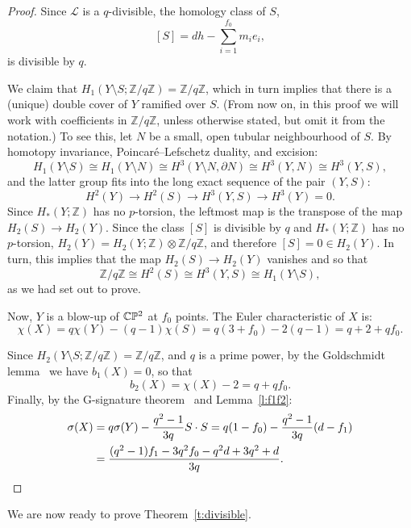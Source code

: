 \documentclass[a4paper,12pt, onesided]{amsart}
\theoremstyle{remark}
\numberwithin{figure}{section}
\numberwithin{equation}{section}
\newcommand{\Z}{\mathbb{Z}}
\newcommand{\CP}{\mathbb{CP}\vphantom{\mathbb{P}}^2}
\renewcommand{\L}{\mathcal{L}}
\newcommand{\del}{\partial}
\begin{document}
\begin{proof}
Since $\L$ is a $q$-divisible, the homology class of $S$,
\[
[S] = dh - \sum_{i=1}^{f_0} m_i e_i,
\]
is divisible by $q$.

We claim that $H_1(Y\setminus S;\Z/q\Z) = \Z/q\Z$, which in turn implies that there is a (unique) double cover of $Y$ ramified over $S$.
(From now on, in this proof we will work with coefficients in $\Z/q\Z$, unless otherwise stated, but omit it from the notation.)
To see this, let $N$ be a small, open tubular neighbourhood of $S$.
By homotopy invariance, Poincar\'e--Lefschetz duality, and excision:
\[
H_1(Y\setminus S) \cong H_1(Y\setminus N) \cong H^3(Y \setminus N, \del N) \cong H^3(Y,N) \cong H^3(Y,S),
\]
and the latter group fits into the long exact sequence of the pair $(Y,S)$:
\[
H^2(Y) \to H^2(S) \to H^3(Y,S) \to H^3(Y) = 0.
\]
Since $H_*(Y;\Z)$ has no $p$-torsion, the leftmost map is the transpose of the map $H_2(S) \to H_2(Y)$.
Since the class $[S]$ is divisible by $q$ and $H_*(Y;\Z)$ has no $p$-torsion, $H_2(Y) = H_2(Y;\Z)\otimes \Z/q\Z$, and therefore $[S] = 0 \in H_2(Y)$.
In turn, this implies that the map $H_2(S) \to H_2(Y)$ vanishes and so that
\[
\Z/q\Z \cong H^2(S) \cong H^3(Y,S) \cong H_1(Y \setminus S),
\]
as we had set out to prove.

Now, $Y$ is a blow-up of $\CP$ at $f_0$ points.
The Euler characteristic of $X$ is:
\[
\chi(X) = q\chi(Y) - (q-1)\chi(S) = q(3+f_0) - 2(q-1) = q + 2 + qf_0.
\]

Since $H_2(Y\setminus S;\Z/q\Z) = \Z/q\Z$, and $q$ is a prime power, by the Goldschmidt lemma~\cite{Hsiang-Szczarba:1970} we have $b_1(X) = 0$, so that
\[
b_2(X) = \chi(X) - 2 = q + qf_0.
\]
Finally, by the G-signature theorem~\cite{Atiyah-Singer:1968} and Lemma~\ref{l:f1f2}:
\begin{align*}
\sigma(X) &= q\sigma(Y) - \frac{q^2-1}{3q} S\cdot S = q(1-f_0) - \frac{q^2-1}{3q}(d-f_1) \\
& = \frac{(q^2-1)f_1 - 3q^2f_0 - q^2d + 3q^2 + d}{3q}.\qedhere
\end{align*}
\end{proof}

We are now ready to prove Theorem~\ref{t:divisible}.
\end{document}
